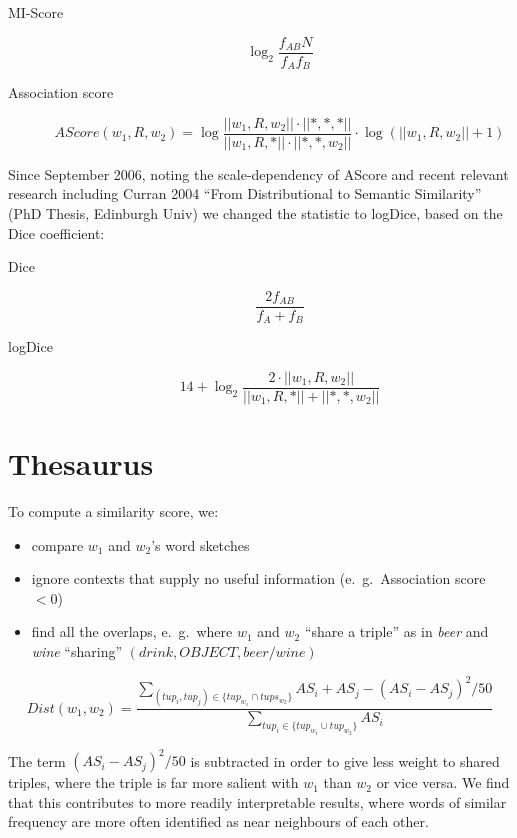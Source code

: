 \documentclass{article}
\begin{document}
\begin{description}

\item[MI-Score] $$\log_2 \frac{f_{AB}  N}{f_A  f_B}$$
\item[Association score]  $$AScore(w_1, R, w_2) =  \log \frac{||w_1,R,w_2|| \cdot
  ||*,*,*||}{||w_1,R,*|| \cdot ||*,*,w_2||} \cdot  \log ( ||w_1,R,w_2|| + 1 )$$
\end{description}

Since September 2006, noting the scale-dependency of AScore and recent relevant research including Curran 2004 ``From Distributional to Semantic Similarity'' (PhD Thesis, Edinburgh Univ) we changed the statistic to logDice, based on the Dice coefficient:
\begin{description}

\item[Dice] $$ \frac{2 f_{AB}}{f_A + f_B} $$

\item[logDice]
$$ 14 + \log_2 \frac{2 \cdot ||w_1,R,w_2||}{||w_1,R,*|| + ||*,*,w_2||} $$

\end{description}


\section{Thesaurus}

To compute a similarity score, we:
\begin{itemize}
  \item compare $w_1$ and $w_2$'s word sketches
  \item ignore contexts that supply no useful information (e.\ g.\ Association score $< 0$)
  \item find all the overlaps, e.\ g.\ where $w_1$ and $w_2$ ``share a triple'' as in {\it beer} and {\it wine} ``sharing'' $(drink, OBJECT, beer/wine)$ 
\end{itemize}

$$Dist (w_1, w_2) = \frac{\sum_{(tup_i, tup_j) \in \{tup_{w_1} \cap
    tups_{w_2}\}} AS_i + AS_j - (AS_i - AS_j)^2/50}
    {\sum_{tup_i \in \{tup_{w_1} \cup tup_{w_2}\} } AS_i }$$

The term $(AS_i - AS_j)^2/50$ is subtracted in order to give less weight to shared triples, where the triple is far more salient with $w_1$ than $w_2$ or vice versa.  We find that this contributes to more readily interpretable results, where words of similar frequency are more often identified as near neighbours of each other.
\end{document}
